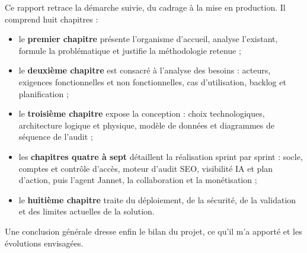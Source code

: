 Ce rapport retrace la démarche suivie, du cadrage à la mise en production. Il comprend huit chapitres :
\begin{itemize}
  \item le \textbf{premier chapitre} présente l'organisme d'accueil, analyse l'existant, formule la problématique et justifie la méthodologie retenue ;
  \item le \textbf{deuxième chapitre} est consacré à l'analyse des besoins : acteurs, exigences fonctionnelles et non fonctionnelles, cas d'utilisation, backlog et planification ;
  \item le \textbf{troisième chapitre} expose la conception : choix technologiques, architecture logique et physique, modèle de données et diagrammes de séquence de l'audit ;
  \item les \textbf{chapitres quatre à sept} détaillent la réalisation sprint par sprint : socle, comptes et contrôle d'accès, moteur d'audit SEO, visibilité IA et plan d'action, puis l'agent Jannet, la collaboration et la monétisation ;
  \item le \textbf{huitième chapitre} traite du déploiement, de la sécurité, de la validation et des limites actuelles de la solution.
\end{itemize}

Une conclusion générale dresse enfin le bilan du projet, ce qu'il m'a apporté et les évolutions envisagées.
